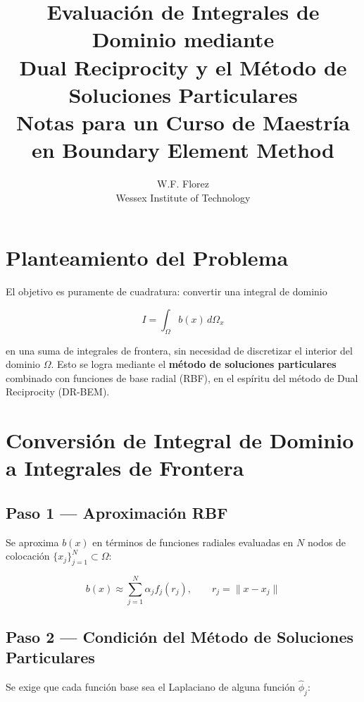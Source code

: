 \documentclass[12pt,a4paper]{article}
\title{\textbf{Evaluación de Integrales de Dominio mediante\\
Dual Reciprocity y el Método de Soluciones Particulares}\\[0.5em]
\large Notas para un Curso de Maestría en Boundary Element Method}
\author{W.F. Florez\\
\small Wessex Institute of Technology}
\date{}
\begin{document}
\maketitle
\tableofcontents
\newpage

\section{Planteamiento del Problema}

El objetivo es puramente de cuadratura: convertir una integral de dominio

\begin{equation}
    I = \int_\Omega b(x)\, d\Omega_x
\end{equation}

en una suma de integrales de frontera, sin necesidad de discretizar el interior
del dominio $\Omega$. Esto se logra mediante el \textbf{método de soluciones
particulares} combinado con funciones de base radial (RBF), en el espíritu del
método de Dual Reciprocity (DR-BEM).

\section{Conversión de Integral de Dominio a Integrales de Frontera}

\subsection{Paso 1 — Aproximación RBF}

Se aproxima $b(x)$ en términos de funciones radiales evaluadas en $N$ nodos de
colocación $\{x_j\}_{j=1}^N \subset \Omega$:

\begin{equation}
    b(x) \approx \sum_{j=1}^{N} \alpha_j f_j(r_j), \qquad r_j = \|x - x_j\|
\end{equation}

\subsection{Paso 2 — Condición del Método de Soluciones Particulares}

Se exige que cada función base sea el Laplaciano de alguna función
$\hat{\phi}_j$:
\end{document}
